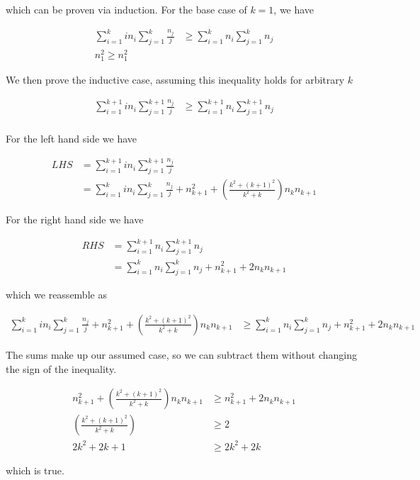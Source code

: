 \documentclass[]{article}
\begin{document}
which can be proven via induction.
For the base case of $k = 1$, we have

\begin{align*}
	\sum_{i=1}^{k}in_i \sum_{j=1}^{k} \frac{n_j}{j} &\geq \sum_{i=1}^{k}n_i \sum_{j=1}^{k} n_j \\
	n_1^2 \geq n_1^2
\end{align*}

We then prove the inductive case, assuming this inequality holds for arbitrary $k$

\begin{align*}
	\sum_{i=1}^{k+1}in_i \sum_{j=1}^{k+1} \frac{n_j}{j} &\geq \sum_{i=1}^{k+1}n_i \sum_{j=1}^{k+1} n_j \\
\end{align*}

For the left hand side we have

\begin{align*}
	LHS &= \sum_{i=1}^{k+1}in_i \sum_{j=1}^{k+1} \frac{n_j}{j} \\
	&= \sum_{i=1}^{k}in_i \sum_{j=1}^{k} \frac{n_j}{j} + n_{k+1}^2 + (\frac{k^2 + (k+1)^2}{k^2 + k})n_k n_{k+1}
\end{align*}

For the right hand side we have

\begin{align*}
	RHS &= \sum_{i=1}^{k+1}n_i \sum_{j=1}^{k+1} n_j \\
	&= \sum_{i=1}^{k}n_i \sum_{j=1}^{k} n_j + n_{k+1}^2 + 2n_kn_{k+1}
\end{align*}

which we reassemble as

\begin{align*}
	\sum_{i=1}^{k}in_i \sum_{j=1}^{k} \frac{n_j}{j} + n_{k+1}^2 + (\frac{k^2 + (k+1)^2}{k^2 + k})n_k n_{k+1} &\geq \sum_{i=1}^{k}n_i \sum_{j=1}^{k} n_j + n_{k+1}^2 + 2n_kn_{k+1}
\end{align*}

The sums make up our assumed case, so we can subtract them without changing the sign of the inequality.

\begin{align*}
	n_{k+1}^2 + (\frac{k^2 + (k+1)^2}{k^2 + k})n_k n_{k+1} &\geq n_{k+1}^2 + 2n_kn_{k+1} \\
	(\frac{k^2 + (k+1)^2}{k^2 + k}) &\geq 2 \\
	2k^2 + 2k + 1 &\geq 2k^2 + 2k
\end{align*}

which is true.
\end{document}
